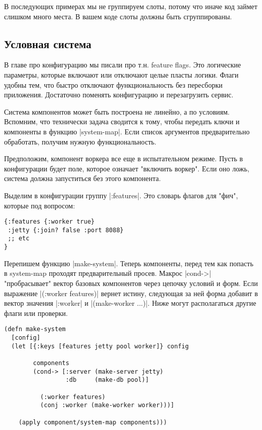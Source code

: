 В последующих примерах мы не группируем слоты, потому что иначе код займет
слишком много места. В вашем коде слоты должны быть сгруппированы.

\subsection{Условная система}

В главе про конфигурацию мы писали про т.н. feature flags. Это логические
параметры, которые включают или отключают целые пласты логики. Флаги удобны тем,
что быстро отключают функциональность без пересборки приложения. Достаточно
поменять конфигурацию и перезагрузить сервис.

Система компонентов может быть построена не линейно, а по условиям. Вспомним,
что технически задача сводится к тому, чтобы передать ключи и компоненты в
функцию \spverb|system-map|. Если список аргументов предварительно обработать, получим
нужную функциональность.

Предположим, компонент воркера все еще в испытательном режиме. Пусть в
конфигурации будет поле, которое означает "включить воркер". Если оно ложь,
система должна запуститься без этого компонента.

Выделим в конфигурации группу \spverb|:features|. Это словарь флагов для "фич", которые
под вопросом:

\begin{verbatim}
{:features {:worker true}
 :jetty {:join? false :port 8088}
 ;; etc
}
\end{verbatim}

Перепишем функцию \spverb|make-system|. Теперь компоненты, перед тем как попасть в
system-map проходят предварительный просев. Макрос \spverb|cond->| "пробрасывает"
вектор базовых компонентов через цепочку условий и форм. Если выражение
\spverb|(:worker features)| вернет истину, следующая за ней форма добавит в вектор
значения \spverb|:worker| и \spverb|(make-worker {...})|. Ниже могут располагаться другие
флаги или проверки.

\begin{verbatim}
(defn make-system
  [config]
  (let [{:keys [features jetty pool worker]} config

        components
        (cond-> [:server (make-server jetty)
                 :db     (make-db pool)]

          (:worker features)
          (conj :worker (make-worker worker)))]

    (apply component/system-map components)))
\end{verbatim}


